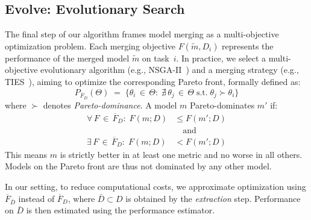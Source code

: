 \subsection{Evolve: Evolutionary Search}
\label{sec:evolve_evo}  
%
The final step of our algorithm frames model merging as a multi-objective optimization problem.  
Each merging objective \( F(\tilde{m}, D_i) \) represents the performance of the merged model \(\tilde{m}\) on task~\(i\). In practice, we select a multi-objective evolutionary algorithm (e.g., NSGA-II~\citep{nsga-ii}) and a merging strategy (e.g., TIES~\citep{ties}), aiming to optimize the corresponding {Pareto front}, formally defined as:  
\[
P_{\overline{F}_D}(\Theta)
\;=\;
\bigl\{
\theta_i \,\in\, \Theta 
:\; \nexists\,\theta_j \,\in\, \Theta
\;\text{s.t.}\;\theta_j \succ \theta_i
\bigr\}
\]  
where \(\succ\) denotes \emph{Pareto-dominance}. A model \(m\) Pareto-dominates \(m'\) if:  
\begin{align*}
\forall \, F \,\in\, \overline{F}_D:\; 
F(m; D) &\leq F(m'; D)\\
&\quad\text{and}\\
\exists \, F \,\in\, \overline{F}_D:\; 
F(m; D) &< F(m'; D)
\end{align*}  
This means \(m\) is strictly better in at least one metric and no worse in all others. Models on the Pareto front are thus not dominated by any other model.

In our setting, to reduce computational costs, we approximate optimization using \(\overline{F}_{\bar{D}}\) instead of \(\overline{F}_D\), where \(\bar{D} \subset D\) is obtained by the \textit{extraction} step. Performance on \(\bar{D}\) is then estimated using the {performance estimator}.  


